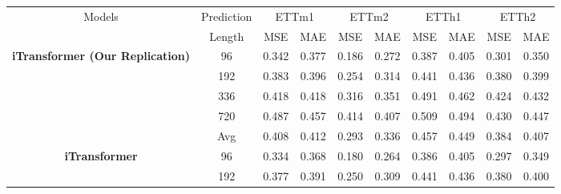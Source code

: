 \documentclass[twoside,12pt]{article}
\begin{document}
\begin{table}[htbp]
{\begin{small}
      \begin{tabular}{c|c|cc|cc|cc|cc}
        \toprule
        \multirow{2}{*}{Models}                                  & Prediction & \multicolumn{2}{c|}{ETTm1} & \multicolumn{2}{c|}{ETTm2} & \multicolumn{2}{c|}{ETTh1} & \multicolumn{2}{c}{ETTh2}                                 \\
        \cmidrule(lr){3-4} \cmidrule(lr){5-6} \cmidrule(lr){7-8} \cmidrule(lr){9-10}
                                                                 & Length     & MSE                        & MAE                        & MSE                        & MAE                       & MSE   & MAE   & MSE   & MAE   \\
        \midrule
        \multirow{5}{*}{\textbf{iTransformer (Our Replication)}} & 96         & 0.342                      & 0.377                      & 0.186                      & 0.272                     & 0.387 & 0.405 & 0.301 & 0.350 \\
                                                                 & 192        & 0.383                      & 0.396                      & 0.254                      & 0.314                     & 0.441 & 0.436 & 0.380 & 0.399 \\
                                                                 & 336        & 0.418                      & 0.418                      & 0.316                      & 0.351                     & 0.491 & 0.462 & 0.424 & 0.432 \\
                                                                 & 720        & 0.487                      & 0.457                      & 0.414                      & 0.407                     & 0.509 & 0.494 & 0.430 & 0.447 \\
        \cmidrule(lr){2-10}
                                                                 & Avg        & 0.408                      & 0.412                      & 0.293                      & 0.336                     & 0.457 & 0.449 & 0.384 & 0.407 \\
        \midrule
        \multirow{5}{*}{\textbf{iTransformer}}                   & 96         & 0.334                      & 0.368                      & 0.180                      & 0.264                     & 0.386 & 0.405 & 0.297 & 0.349 \\
                                                                 & 192        & 0.377                      & 0.391                      & 0.250                      & 0.309                     & 0.441 & 0.436 & 0.380 & 0.400 \\

\end{tabular}
\end{small}}
\end{table}
\end{document}
